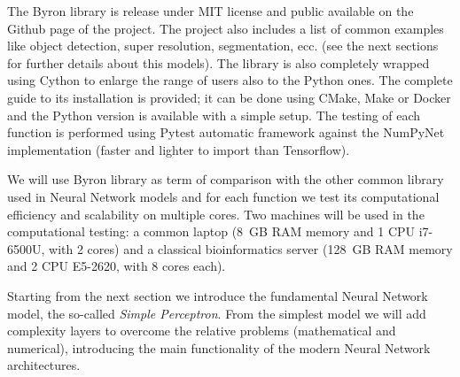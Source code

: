 \documentclass{standalone}
\begin{document}
The \textsf{Byron} library is release under \textsf{MIT} license and public available on the \textsf{Github} page of the project.
The project also includes a list of common examples like object detection, super resolution, segmentation, ecc. (see the next sections for further details about this models).
The library is also completely wrapped using \textsf{Cython} to enlarge the range of users also to the \textsf{Python} ones.
The complete guide to its installation is provided; it can be done using \textsf{CMake}, \textsf{Make} or \textsf{Docker} and the \textsf{Python} version is available with a simple \textsf{setup}.
The testing of each function is performed using \textsf{Pytest} automatic framework against the \textsf{NumPyNet} implementation (faster and lighter to import than \textsf{Tensorflow}).

We will use \textsf{Byron} library as term of comparison with the other common library used in Neural Network models and for each function we test its computational efficiency and scalability on multiple cores.
Two machines will be used in the computational testing: a common laptop (8~GB RAM memory and 1 CPU i7-6500U, with 2 cores) and a classical bioinformatics server (128~GB RAM memory and 2 CPU E5-2620, with 8 cores each).

Starting from the next section we introduce the fundamental Neural Network model, the so-called \emph{Simple Perceptron}.
From the simplest model we will add complexity layers to overcome the relative problems (mathematical and numerical), introducing the main functionality of the modern Neural Network architectures.
\end{document}
